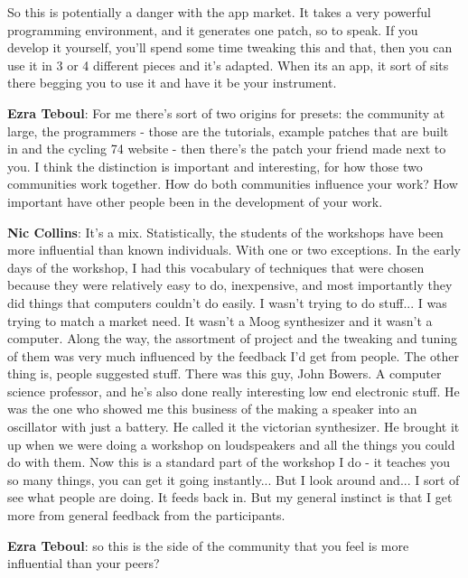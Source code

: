 So this is potentially a danger with the app market. It takes a very powerful programming environment, and it generates one patch, so to speak. If you develop it yourself, you’ll spend some time tweaking this and that, then you can use it in 3 or 4 different pieces and it’s adapted. When its an app, it sort of sits there begging you to use it and have it be your instrument.
					
\textbf{Ezra Teboul}: For me there’s sort of two origins for presets: the community at large, the programmers - those are the tutorials, example patches that are built in and the cycling 74 website - then there’s the patch your friend made next to you. I think the distinction is important and interesting, for how those two communities work together. How do both communities influence your work? How important have other people been in the development of your work.
					
\textbf{Nic Collins}: It’s a mix. Statistically, the students of the workshops have been more influential than known individuals. With one or two exceptions. In the early days of the workshop, I had this vocabulary of techniques that were chosen because they were relatively easy to do, inexpensive, and most importantly they did things that computers couldn’t do easily. I wasn’t trying to do stuff... I was trying to match a market need. It wasn’t a Moog synthesizer and it wasn’t a computer. Along the way, the assortment of project and the tweaking and tuning of them was very much influenced by the feedback I’d get from people. The other thing is, people suggested stuff. There was this guy, John Bowers. A computer science professor, and he’s also done really interesting low end electronic stuff. He was the one who showed me this business of the making a speaker into an oscillator with just a battery. He called it the victorian synthesizer. He brought it up when we were doing a workshop on loudspeakers and all the things you could do with them. Now this is a standard part of the workshop I do - it teaches you so many things, you can get it going instantly... But I look around and... I sort of see what people are doing. It feeds back in. But my general instinct is that I get more from general feedback from the participants.
					
\textbf{Ezra Teboul}: so this is the side of the community that you feel is more influential than your peers?
					
